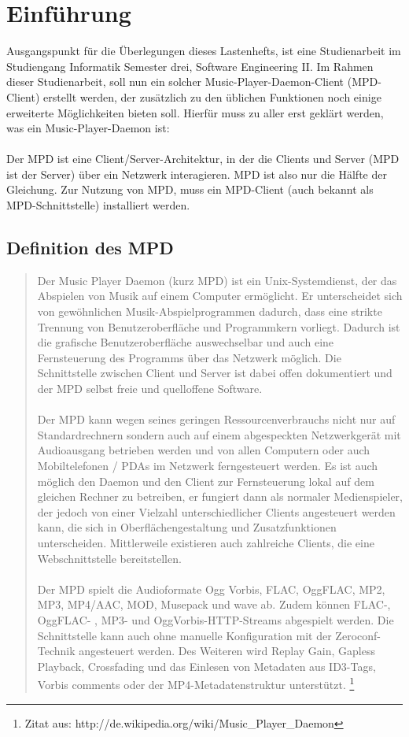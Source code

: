 \chapter{Einführung}
Ausgangspunkt für die Überlegungen dieses Lastenhefts, ist eine Studienarbeit im Studiengang Informatik Semester drei, Software Engineering II.
Im Rahmen dieser Studienarbeit, soll nun ein solcher Music-Player-Daemon-Client (MPD-Client) erstellt werden, der zusätzlich zu den üblichen Funktionen noch einige erweiterte Möglichkeiten bieten soll. Hierfür muss zu aller erst geklärt werden, was ein Music-Player-Daemon ist:
\ \\ \\
Der MPD ist eine Client/Server-Architektur, in der die Clients und Server (MPD ist der Server) über ein Netzwerk interagieren. MPD ist also nur die Hälfte der Gleichung. Zur Nutzung von MPD, muss ein MPD-Client (auch bekannt als MPD-Schnittstelle) installiert werden.

\section{Definition des MPD}
\begin{quote}
Der Music Player Daemon (kurz MPD) ist ein Unix-Systemdienst, der das Abspielen
von Musik auf einem Computer ermöglicht. Er unterscheidet sich von gewöhnlichen
Musik-Abspielprogrammen dadurch, dass eine strikte Trennung von Benutzeroberfläche und Programmkern vorliegt. Dadurch ist die grafische Benutzeroberfläche auswechselbar und auch eine Fernsteuerung des Programms über das Netzwerk möglich.
Die Schnittstelle zwischen Client und Server ist dabei offen dokumentiert und der
MPD selbst freie und quelloffene Software.\ \\ \\
Der MPD kann wegen seines geringen Ressourcenverbrauchs nicht nur auf Standardrechnern sondern auch auf einem abgespeckten Netzwerkgerät mit Audioausgang
betrieben werden und von allen Computern oder auch Mobiltelefonen / PDAs im Netzwerk ferngesteuert werden. Es ist auch möglich den Daemon und den Client zur Fernsteuerung lokal auf dem gleichen Rechner zu betreiben, er fungiert dann als normaler Medienspieler, der jedoch von einer Vielzahl unterschiedlicher Clients angesteuert werden kann, die sich in Oberflächengestaltung und Zusatzfunktionen unterscheiden. Mittlerweile existieren auch zahlreiche Clients, die eine Webschnittstelle bereitstellen.\ \\ \\
Der MPD spielt die Audioformate Ogg Vorbis, FLAC, OggFLAC, MP2, MP3, MP4/AAC, MOD, Musepack und wave ab. Zudem können FLAC-, OggFLAC-
, MP3- und OggVorbis-HTTP-Streams abgespielt werden. Die Schnittstelle kann
auch ohne manuelle Konfiguration mit der Zeroconf-Technik angesteuert werden.
Des Weiteren wird Replay Gain, Gapless Playback, Crossfading und das Einlesen
von Metadaten aus ID3-Tags, Vorbis comments oder der MP4-Metadatenstruktur
unterstützt.
\footnote{Zitat aus: http://de.wikipedia.org/wiki/Music\_Player\_Daemon}
\end{quote}

